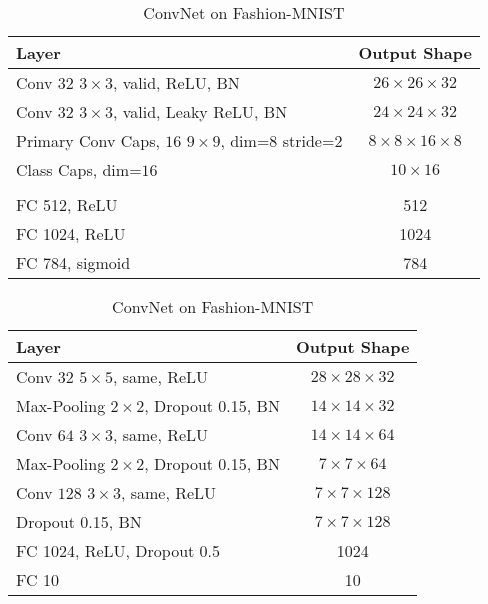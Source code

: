 \begin{table}
	\centering
	
	\begin{tabular}{lc}
		\toprule
		Layer	& Output Shape \\ 
		\midrule 
		Conv $32$ $3\times3$, valid, ReLU, BN	&  $26\times26\times32$ \\ 
		\midrule 
		Conv $32$ $3\times3$, valid, Leaky ReLU, BN	&  $24\times24\times32$\\ 
		\midrule 
		Primary Conv Caps, $16$ $9\times9$, dim=$8$	stride=$2$ &  $8\times8\times16\times8$\\ 
		\midrule 
		Class Caps, dim=$16$	&  $10\times16$\\ 
		\midrule 
		& \\
		\midrule
		FC 512, ReLU	& 512 \\
		\midrule
		FC 1024, ReLU	& 1024 \\
		\midrule
		FC 784, sigmoid	& 784 \\
		\bottomrule
	\end{tabular}
	\caption{CapsNet on Fashion-MNIST}
	\label{tab:capsnet:fashion}
	
	\vspace{0.75cm}
	
	\begin{tabular}{lc}
		\toprule 
		Layer	&  Output Shape \\ 
		\midrule
		Conv $32$ $5\times5$, same,	ReLU & $28\times28\times32$ \\ 
		\midrule
		Max-Pooling $2\times2$, Dropout 0.15, BN	&  $14\times14\times32$ \\ 
		\midrule 
		Conv $64$ $3\times3$, same, ReLU	& $14\times14\times64$ \\ 
		\midrule 
		Max-Pooling $2\times2$, Dropout 0.15, BN	& $7\times7\times64$ \\
		\midrule
		Conv $128$ $3\times3$, same, ReLU	& $7\times7\times128$ \\
		\midrule
		Dropout 0.15, BN	& $7\times7\times128$ \\
		\midrule
		FC 1024, ReLU, Dropout 0.5 & 1024 \\
		\midrule
		FC 10 & 10\\
		\bottomrule
	\end{tabular} 
	\caption{ConvNet on Fashion-MNIST}
	\label{tab:convnet:fashion}
\end{table}


